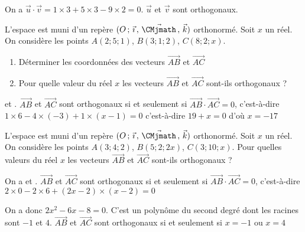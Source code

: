 \documentclass[11pt,fleqn, openany]{book} %
\begin{document}
\begin{solution}On a $\vec u \cdot \vec v = 1 \times 3 + 5 \times 3 - 9 \times 2 =0$. $\vec u$ et $\vec v$ sont orthogonaux.\end{solution}



\begin{exercise}L'espace est muni d'un repère $\Oijk$ orthonormé. Soit $x$ un réel. On considère les points $A(2;5;1)$, $B(3;1;2)$, $C(8;2;x)$. 

\begin{enumerate}
\item Déterminer les coordonnées des vecteurs $\overrightarrow{AB}$ et $\overrightarrow{AC}$
\item Pour quelle valeur du réel $x$ les vecteurs $\overrightarrow{AB}$ et $\overrightarrow{AC}$ sont-ils orthogonaux ?
\end{enumerate}
\end{exercise}

\begin{solution}  et . $\overrightarrow{AB}$ et $\overrightarrow{AC}$ sont orthogonaux si et seulement si $\overrightarrow{AB}\cdot \overrightarrow{AC}=0$, c'est-à-dire $1 \times 6 -4 \times (-3) + 1 \times (x-1)=0$ c'est-à-dire $19+x=0$ d'où $x=-17$\end{solution}




\begin{exercise}L'espace est muni d'un repère $\Oijk$ orthonormé. Soit $x$ un réel. On considère les points $A(3;4;2)$, $B(5;2;2x)$, $C(3;10;x)$. Pour quelles valeurs du réel $x$ les vecteurs $\overrightarrow{AB}$ et $\overrightarrow{AC}$ sont-ils orthogonaux ?\end{exercise}

\begin{solution}On a  et . $\overrightarrow{AB}$ et $\overrightarrow{AC}$ sont orthogonaux si et seulement si $\overrightarrow{AB}\cdot \overrightarrow{AC}=0$, c'est-à-dire $2 \times 0 -2\times 6 +(2x-2) \times (x-2)=0$

On a donc $2x^2-6x-8=0$. C'est un polynôme du second degré dont les racines sont $-1$ et $4$. $\overrightarrow{AB}$ et $\overrightarrow{AC}$ sont orthogonaux si et seulement si $x=-1$ ou $x=4$\end{solution}
\end{document}
